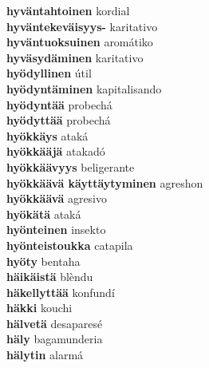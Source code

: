 \textbf{ hyväntahtoinen  } kordial \\
\textbf{ hyväntekeväisyys-  } karitativo \\
\textbf{ hyväntuoksuinen  } aromátiko \\
\textbf{ hyväsydäminen  } karitativo \\
\textbf{ hyödyllinen  } útil \\
\textbf{ hyödyntäminen  } kapitalisando \\
\textbf{ hyödyntää  } probechá \\
\textbf{ hyödyttää  } probechá \\
\textbf{ hyökkäys  } ataká \\
\textbf{ hyökkääjä  } atakadó \\
\textbf{ hyökkäävyys  } beligerante \\
\textbf{ hyökkäävä käyttäytyminen  } agreshon \\
\textbf{ hyökkäävä  } agresivo \\
\textbf{ hyökätä  } ataká \\
\textbf{ hyönteinen  } insekto \\
\textbf{ hyönteistoukka  } catapila \\
\textbf{ hyöty  } bentaha \\
\textbf{ häikäistä  } blèndu \\
\textbf{ häkellyttää  } konfundí \\
\textbf{ häkki  } kouchi \\
\textbf{ hälvetä  } desaparesé \\
\textbf{ häly  } bagamunderia \\
\textbf{ hälytin  } alarmá \\
